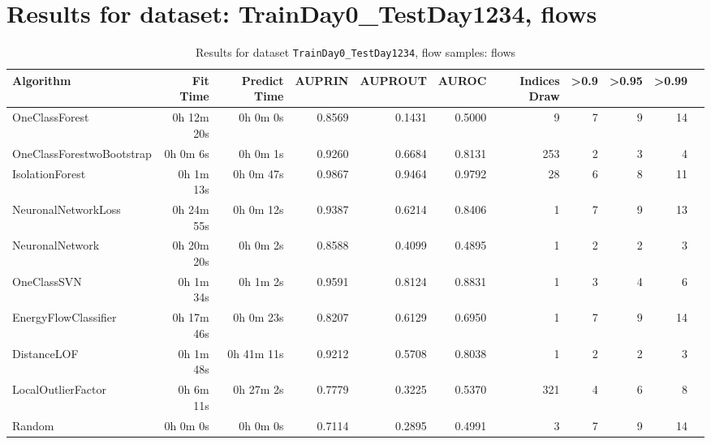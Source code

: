 \documentclass{article}
\begin{document}
\section*{Results for dataset: TrainDay0_TestDay1234, flows}
\begin{table}[h!]
\centering
\caption{Results for dataset \texttt{TrainDay0_TestDay1234}, flow samples: flows}
\label{tab:trainday0testday1234_flows}
\begin{tabular}{lrrrrrrrrrr}
\toprule
Algorithm & Fit Time & Predict Time & AUPRIN & AUPROUT & AUROC & Indices Draw & >0.9 & >0.95 & >0.99 \\
\midrule
OneClassForest & 0h 12m 20s & 0h 0m 0s & 0.8569 & 0.1431 & 0.5000 & 9 & 7 & 9 & 14 \\
OneClassForestwoBootstrap & 0h 0m 6s & 0h 0m 1s & 0.9260 & 0.6684 & 0.8131 & 253 & 2 & 3 & 4 \\
IsolationForest & 0h 1m 13s & 0h 0m 47s & 0.9867 & 0.9464 & 0.9792 & 28 & 6 & 8 & 11 \\
NeuronalNetworkLoss & 0h 24m 55s & 0h 0m 12s & 0.9387 & 0.6214 & 0.8406 & 1 & 7 & 9 & 13 \\
NeuronalNetwork & 0h 20m 20s & 0h 0m 2s & 0.8588 & 0.4099 & 0.4895 & 1 & 2 & 2 & 3 \\
OneClassSVN & 0h 1m 34s & 0h 1m 2s & 0.9591 & 0.8124 & 0.8831 & 1 & 3 & 4 & 6 \\
EnergyFlowClassifier & 0h 17m 46s & 0h 0m 23s & 0.8207 & 0.6129 & 0.6950 & 1 & 7 & 9 & 14 \\
DistanceLOF & 0h 1m 48s & 0h 41m 11s & 0.9212 & 0.5708 & 0.8038 & 1 & 2 & 2 & 3 \\
LocalOutlierFactor & 0h 6m 11s & 0h 27m 2s & 0.7779 & 0.3225 & 0.5370 & 321 & 4 & 6 & 8 \\
Random & 0h 0m 0s & 0h 0m 0s & 0.7114 & 0.2895 & 0.4991 & 3 & 7 & 9 & 14 \\
\bottomrule
\end{tabular}
\end{table}
\end{document}
